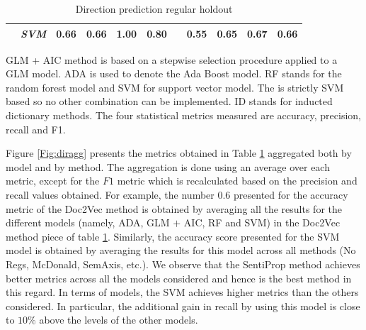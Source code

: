 \documentclass[a4paper, 12pt]{report}
\begin{document}
\begin{table}[H]
\begin{threeparttable}
\begin{tabular}{rrrrrrrrrrr}
      & \textit{SVM} & \textbf{0.66} & 0.66 & \textbf{1.00} & \textbf{0.80}& & 0.55 & 0.65 & 0.67 & 0.66\\
       \bottomrule
    \end{tabular}
    \begin{tablenotes}
      \footnotesize
      \item GLM + AIC method is based on a stepwise selection procedure applied to a GLM model. ADA is used to denote the Ada Boost model. RF stands for the random forest model and SVM for support vector model. The \textcite{Gupta:2020} is strictly SVM based so no other combination can be implemented. ID stands for inducted dictionary methods. The four statistical metrics measured are accuracy, precision, recall and F1.
    \end{tablenotes}
    \caption{Direction prediction regular holdout}
    \label{Tab:acc cv}
  \end{threeparttable}
    \end{table}
    
    
    Figure \ref{Fig:diragg} presents the metrics obtained in Table \ref{Tab:acc cv} aggregated both by model and by method. The aggregation is done using an average over each metric, except for the $F1$ metric which is recalculated based on the precision and recall values obtained. For example, the number $0.6$ presented for the accuracy metric of the Doc2Vec method is obtained by averaging all the results for the different models (namely, ADA, GLM $+$ AIC, RF and SVM) in the Doc2Vec method piece of table \ref{Tab:acc cv}. Similarly, the accuracy score presented for the SVM model is obtained by averaging the results for this model across all methods (No Regs, McDonald, SemAxis, etc.). We observe that the SentiProp method achieves better metrics across all the models considered and hence is the best method in this regard. In terms of models, the SVM achieves higher metrics than the others considered. In particular, the additional gain in recall by using this model is close to $10\%$ above the levels of the other models. 
    
\end{document}

